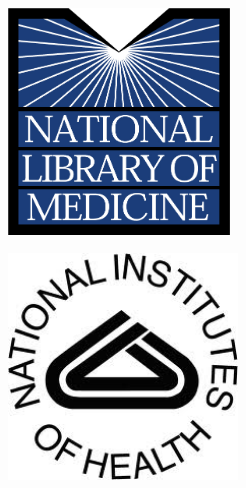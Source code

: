 \documentclass[landscape,a0,final]{a0poster}
\begin{document}
\begin{header}
\begin{minipage}[t]{0.24\textwidth}
  \par\vspace*{-2.5em}
	\begin{flushleft}
		\includegraphics[height=6cm]{images/nlm_logo.jpg}
	\end{flushleft}
\end{minipage}
\hfill
\begin{minipage}[t]{0.5\textwidth}
  \begin{center}
  

    { \bf {} }
  \end{center}
\end{minipage}
\hfill
\begin{minipage}[t]{0.24\textwidth}
	\par\vspace*{-2.5em}
	\begin{flushright}
 		\includegraphics[height=6cm]{images/nih_logo.jpg}
	\end{flushright}
\end{minipage}


\end{header}
\end{document}
